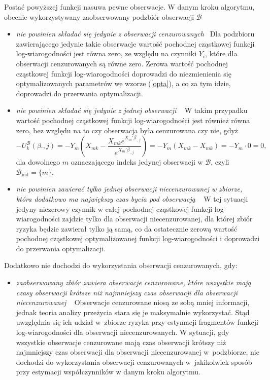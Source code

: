 Postać powyższej funkcji nasuwa pewne obserwacje. W danym kroku algorytmu, obecnie wykorzystywany zaobserwowany podzbiór obserwacji \(\mathcal{B}\)
\begin{itemize}
\item \textit{nie powinien składać się jedynie z obserwacji cenzurowanych} \newline \ \newline Dla podzbioru zawierającego jedynie takie obserwacje wartość pochodnej cząstkowej funkcji log-wiarogodności jest równa zero, ze względu na czynniki $Y_i$, które dla obserwacji cenzurowanych są równe zero. Zerowa wartość pochodnej cząstkowej funkcji log-wiarogodności doprowadzi do niezmienienia się optymalizowanych parametrów we wzorze (\ref{opta}), a co za tym idzie, doprowadzi do przerwania optymalizacji.
\item \textit{nie powinien składać się jedynie z jednej obserwacji} \newline \ \newline  
W takim przypadku wartość pochodnej cząstkowej funkcji log-wiarogodności jest również równa zero, bez względu na to czy obserwacja była cenzurowana czy nie, gdyż 
$$-U_{k}^{\mathcal{B}}(\beta{.,j})=-Y_m\left(X_{mk}-\dfrac{ X_{mk} e^{X_m'\beta_{.,j}}}{ e^{X_m'\beta_{.,j}}}\right) = -Y_m\left(X_{mk}-X_{mk}\right) = -Y_m \cdot 0 = 0,$$
dla dowolnego $m$ oznaczającego indeks jedynej obserwacji w $\mathcal{B}$, czyli $\mathcal{B}_{\text{ind}}=\{m\}$. 
\item \textit{nie powinien zawierać tylko jednej obserwacji niecenzurowanej w zbiorze, która dodatkowo ma największy czas bycia pod obserwacją} \newline \ \newline 
W tej sytuacji jedyny niezerowy czynnik w całej pochodnej cząstkowej funkcji log-wiarogodności zajdzie tylko dla obserwacji niecenzurowanej, dla której zbiór ryzyka będzie zawierał tylko ją samą, co da ostatecznie zerową wartość pochodnej cząstkowej optymalizowanej funkcji log-wiarogodności i doprowadzi do przerwania optymalizacji.
\end{itemize}

Dodatkowo nie dochodzi do wykorzystania obserwacji cenzurowanych, gdy:
\begin{itemize}
\item \textit{zaobserwowany zbiór zawiera obserwacje cenzurowane, które wszystkie mają czasy obserwacji krótsze niż najmniejszy czas obserwacji dla obserwacji niecenzurowanej} \newline \ \newline 
Obserwacje cenzurowane niosą ze sobą mniej informacji, jednak teoria analizy przeżycia stara się je maksymalnie wykorzystać. Stąd uwzględnia się ich udział w~zbiorze ryzyka przy estymacji fragmentów funkcji log-wiarogodności dla obserwacji niecenzurowanych. W sytuacji, gdy wszystkie obserwacje cenzurowane mają czas obserwacji krótszy niż najmniejszy czas obserwacji dla obserwacji niecenzurowanej w~podzbiorze, nie dochodzi do wykorzystania obserwacji cenzurowanych w~jakikolwiek sposób przy estymacji współczynników w danym kroku algorytmu.
\end{itemize}


